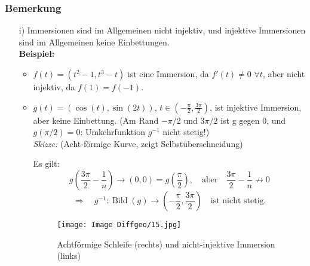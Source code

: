 \documentclass[fleqn, 12pt, letterpaper]{article}
\begin{document}
\subsubsection*{Bemerkung}
\begin{itemize}
\item[i)] Immersionen sind im Allgemeinen nicht injektiv, und injektive Immersionen sind im Allgemeinen keine Einbettungen.\\
\textbf{Beispiel:}
\begin{itemize}
  \item \( f(t) = (t^2-1,t^3-t ) \) ist eine Immersion, da \( f'(t) \neq 0 \,\,   \forall t \), aber nicht injektiv, da \( f(1) = f(-1) \). 

  \item \( g(t) = (\cos(t),\sin(2t)) \), \quad \( t \in \left( -\frac{\pi}{2},   \frac{3\pi}{2} \right) \), ist injektive Immersion, aber keine Einbettung. (Am Rand $-\pi/2$ und $3\pi/2$ ist g gegen 0, und $g(\pi/2)=0$: Umkehrfunktion $g^{-1}$ nicht stetig!)\\
  \textit{Skizze:} (Acht-förmige Kurve, zeigt Selbstüberschneidung)

  Es gilt:
  \[
  g\left( \frac{3\pi}{2} - \frac{1}{n} \right) \to (0 , 0) = g(\frac{\pi}{2}), \quad   \text{aber} \quad \frac{3\pi}{2} - \frac{1}{n} \not\to 0
  \]
  \[
  \Rightarrow \quad g^{-1}: \operatorname{Bild}(g) \to \left(-\frac{\pi}  {2}, \frac{3\pi}{2}\right) \quad \text{ist nicht stetig.}
  \]
  \begin{figure}[H]
    \centering
    \texttt{[image: Image Diffgeo/15.jpg]}
  \caption{Achtförmige Schleife (rechts) und nicht-injektive Immersion (links)}
  \end{figure}
\end{itemize}
\end{itemize}
\end{document}
